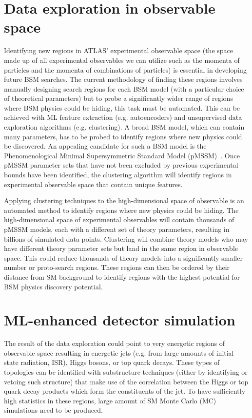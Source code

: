 \documentclass[letter, USenglish, 11pt]{article}
\begin{document}
\section*{Data exploration in observable space}
Identifying new regions in ATLAS' experimental observable space (the space made up of all experimental observables we can utilize such as the momenta of particles and the momenta of combinations of particles) is essential in developing future BSM searches. The current methodology of finding these regions involves manually designing search regions for each BSM model (with a particular choice of theoretical parameters) but to probe a significantly wider range of regions where BSM physics could be hiding, this task must be automated. This can be achieved with ML feature extraction (e.g. autoencoders) and unsupervised data exploration algorithms (e.g. clustering). A broad BSM model, which can contain many parameters, has to be probed to identify regions where new physics could be discovered. An appealing candidate for such a BSM model is the Phenomenological 
Minimal Supersymmetric Standard Model (pMSSM)~\cite{Berger:2008cq}. Once pMSSM parameter sets that have not been excluded by previous experimental bounds have been identified, the clustering algorithm will identify regions in experimental observable space that contain unique features. 

Applying clustering techniques to the high-dimensional space of observable is an automated method to identify regions where new physics could be hiding. The high-dimensional space of experimental observables will contain thousands of pMSSM models, each with a different set of theory parameters, resulting in billions of simulated data points. Clustering will combine theory models who may have different theory parameter sets but land in the same region in observable space. This could reduce thousands of theory models into a significantly smaller number or proto-search regions. These regions can then be ordered by their distance from SM background to identify regions with the highest potential for BSM physics discovery potential.


\section*{ML-enhanced detector simulation}

The result of the data exploration could point to very energetic regions of observable space resulting in energetic jets (e.g. from large amounts of initial state radiation, ISR), Higgs bosons, or top quark decays. These types of topologies can be identified with substructure techniques (either by identifying or vetoing such structure) that make use of the correlation between the Higgs or top quark decay products which form the constituents of the jet. To have sufficiently high statistics in these regions, large amount of SM Monte Carlo (MC) simulations need to be produced.
\end{document}
